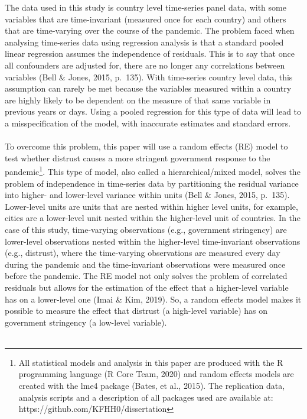\documentclass[
  12pt,
]{article}
\begin{document}
The data used in this study is country level time-series panel data, with some variables that are time-invariant (measured once for each country) and others that are time-varying over the course of the pandemic. The problem faced when analysing time-series data using regression analysis is that a standard pooled linear regression assumes the independence of residuals. This is to say that once all confounders are adjusted for, there are no longer any correlations between variables (Bell \& Jones, 2015, p.~135). With time-series country level data, this assumption can rarely be met because the variables measured within a country are highly likely to be dependent on the measure of that same variable in previous years or days. Using a pooled regression for this type of data will lead to a misspecification of the model, with inaccurate estimates and standard errors.\\
~\\
To overcome this problem, this paper will use a random effects (RE) model to test whether distrust causes a more stringent government response to the pandemic\footnote{All statistical models and analysis in this paper are produced with the R programming language (R Core Team, 2020) and random effects models are created with the lme4 package (Bates, et al., 2015). The replication data, analysis scripts and a description of all packages used are available at: https://github.com/KFHH0/dissertation}. This type of model, also called a hierarchical/mixed model, solves the problem of independence in time-series data by partitioning the residual variance into higher- and lower-level variance within units (Bell \& Jones, 2015, p.~135). Lower-level units are units that are nested within higher level units, for example, cities are a lower-level unit nested within the higher-level unit of countries. In the case of this study, time-varying observations (e.g., government stringency) are lower-level observations nested within the higher-level time-invariant observations (e.g., distrust), where the time-varying observations are measured every day during the pandemic and the time-invariant observations were measured once before the pandemic. The RE model not only solves the problem of correlated residuals but allows for the estimation of the effect that a higher-level variable has on a lower-level one (Imai \& Kim, 2019). So, a random effects model makes it possible to measure the effect that distrust (a high-level variable) has on government stringency (a low-level variable).\\
~\\
\end{document}
